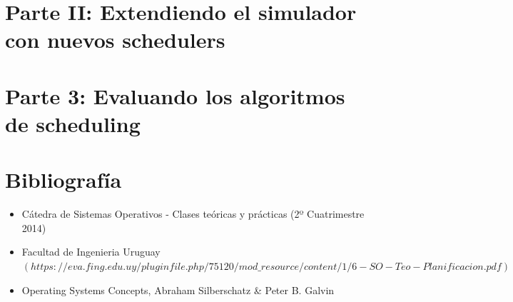\documentclass[a4paper,10pt,twoside]{article}
\begin{document}
\section{Parte II: Extendiendo el simulador con nuevos schedulers}


\newpage

\section{Parte 3: Evaluando los algoritmos de scheduling}


\newpage



\newpage
\section{Bibliografía}

\begin{itemize}
 \item Cátedra de Sistemas Operativos - Clases teóricas y prácticas (2º Cuatrimestre 2014)
 \item Facultad de Ingenieria Uruguay \\
 $(https://eva.fing.edu.uy/pluginfile.php/75120/mod\_resource/content/1/6-SO-Teo-Planificacion.pdf)$
 \item Operating Systems Concepts, Abraham Silberschatz \& Peter B. Galvin
\end{itemize}
\end{document}
